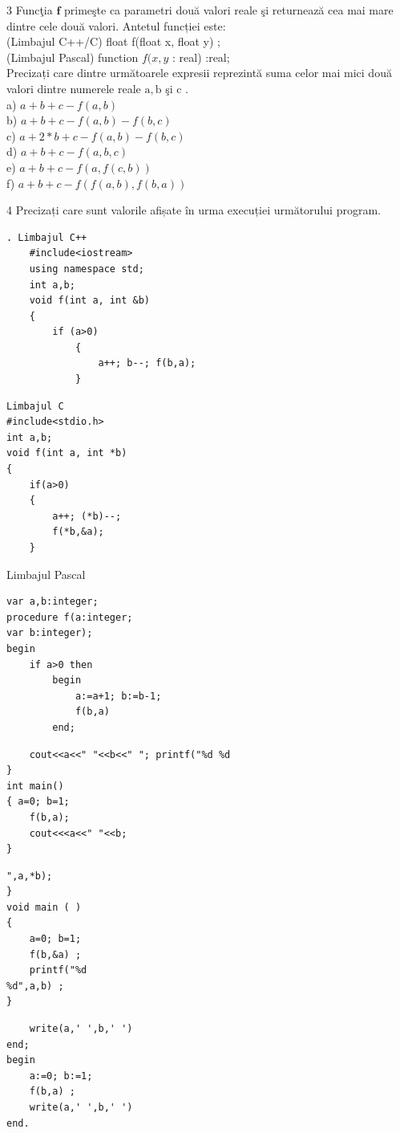 \documentclass[10pt]{article}
\begin{document}
3 Funcţia $\mathbf{f}$ primeşte ca parametri două valori reale şi returnează cea mai mare dintre cele două valori. Antetul funcției este:\\
(Limbajul C++/C) float f(float x, float y) ;\\
(Limbajul Pascal) function $f(x, y$ : real) :real;\\
Precizați care dintre următoarele expresii reprezintă suma celor mai mici două valori dintre numerele reale $\mathrm{a}, \mathrm{b}$ şi c .\\
a) $a+b+c-f(a, b)$\\
b) $a+b+c-f(a, b)-f(b, c)$\\
c) $a+2 * b+c-f(a, b)-f(b, c)$\\
d) $a+b+c-f(a, b, c)$\\
e) $a+b+c-f(a, f(c, b))$\\
f) $a+b+c-f(f(a, b), f(b, a))$

4 Precizați care sunt valorile afișate în urma execuției următorului program.

\begin{verbatim}
. Limbajul C++
    #include<iostream>
    using namespace std;
    int a,b;
    void f(int a, int &b)
    {
        if (a>0)
            {
                a++; b--; f(b,a);
            }
\end{verbatim}

\begin{verbatim}
Limbajul C
#include<stdio.h>
int a,b;
void f(int a, int *b)
{
    if(a>0)
    {
        a++; (*b)--;
        f(*b,&a);
    }
\end{verbatim}

Limbajul Pascal

\begin{verbatim}
var a,b:integer;
procedure f(a:integer;
var b:integer);
begin
    if a>0 then
        begin
            a:=a+1; b:=b-1;
            f(b,a)
        end;
\end{verbatim}

\begin{verbatim}
    cout<<a<<" "<<b<<" "; printf("%d %d
}
int main()
{ a=0; b=1;
    f(b,a);
    cout<<<a<<" "<<b;
}
\end{verbatim}

\begin{verbatim}
",a,*b);
}
void main ( )
{
    a=0; b=1;
    f(b,&a) ;
    printf("%d
%d",a,b) ;
}
\end{verbatim}

\begin{verbatim}
    write(a,' ',b,' ')
end;
begin
    a:=0; b:=1;
    f(b,a) ;
    write(a,' ',b,' ')
end.
\end{verbatim}
\end{document}
